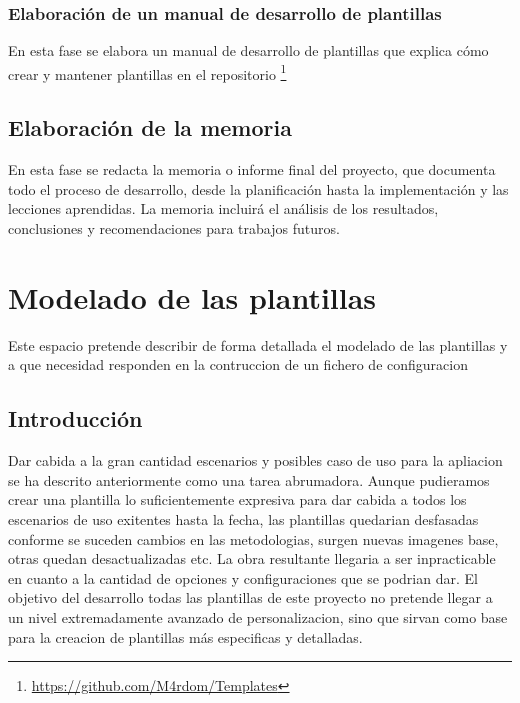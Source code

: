 \documentclass[12pt, a4paper, twoside]{article}
\begin{document}
\subsubsection{Elaboración de un manual de desarrollo de plantillas}
En esta fase se elabora un manual de desarrollo de plantillas que explica cómo crear y mantener plantillas en el repositorio \footnote{\href{https://github.com/M4rdom/Templates}{https://github.com/M4rdom/Templates}}
\subsection{Elaboración de la memoria}
En esta fase se redacta la memoria o informe final del proyecto, que documenta todo el proceso de desarrollo, desde la 
planificación hasta la implementación y las lecciones aprendidas. La memoria incluirá el análisis de los resultados, 
conclusiones y recomendaciones para trabajos futuros. 



















\section{Modelado de las plantillas}
\label{sec:Modelado de las plantillas}
Este espacio pretende describir de forma detallada el modelado de las plantillas y a que necesidad responden en la contruccion de un fichero de configuracion
\subsection{Introducción}
Dar cabida a la gran cantidad escenarios y posibles caso de uso para la apliacion se ha descrito anteriormente como una tarea abrumadora.
Aunque pudieramos crear una plantilla lo suficientemente expresiva para dar cabida a todos los escenarios de uso exitentes hasta la fecha, las plantillas quedarian desfasadas conforme se suceden cambios 
en las metodologias, surgen nuevas imagenes base, otras quedan desactualizadas etc. La obra resultante llegaria a ser inpracticable en cuanto a la cantidad de opciones y configuraciones que se podrian dar.
El objetivo del desarrollo todas las plantillas de este proyecto no pretende llegar a un nivel extremadamente avanzado de personalizacion, sino que sirvan como base para la creacion de plantillas más especificas y detalladas.
\end{document}
